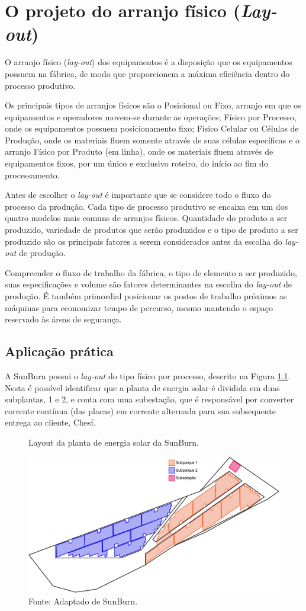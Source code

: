 \chapter{O projeto do arranjo físico (\textit{Lay-out})}
\label{chap:projeto_do_arranjo}
O arranjo físico (\textit{lay-out}) dos equipamentos é a disposição que os equipamentos possuem na fábrica, de modo que proporcionem a máxima eficiência dentro do processo produtivo.

Os principais tipos de arranjos físicos são o Posicional ou Fixo, arranjo em que os equipamentos e operadores movem-se durante as operações; Físico por Processo, onde os equipamentos possuem posicionamento fixo; Físico Celular ou Células de Produção, onde os materiais fluem somente através de suas células específicas e o arranjo Físico por Produto (em linha), onde os materiais fluem através de equipamentos fixos, por um único e exclusivo roteiro, do início ao fim do processamento.

Antes de escolher o \textit{lay-out} é importante que se considere todo o fluxo do processo da produção. Cada tipo de processo produtivo se encaixa em um dos quatro modelos mais comuns de arranjos físicos. Quantidade do produto a ser produzido, variedade de produtos que serão produzidos e o tipo de produto a ser produzido são os principais fatores a serem considerados antes da escolha do \textit{lay-out} de produção.

Compreender o fluxo de trabalho da fábrica, o tipo de elemento a ser produzido, suas especificações e volume são fatores determinantes na escolha do \textit{lay-out} de produção. É também primordial posicionar os postos de trabalho próximos as máquinas para economizar tempo de percurso, mesmo mantendo o espaço reservado às áreas de segurança.

\section{Aplicação prática}
\label{sec:projeto_do_arranjo_aplicacao}
A SunBurn possui o \textit{lay-out} do tipo físico por processo, descrito na Figura \ref{fig:arranjo_fisico_aplicacao}. Nesta é possível identificar que a planta de energia solar é dividida em duas subplantas, 1 e 2, e conta com uma subestação, que é responsável por converter corrente contínua (das placas) em corrente alternada para sua subsequente entrega ao cliente, Chesf.


\begin{figure}[H]
    \caption{Layout da planta de energia solar da SunBurn.}
    \includegraphics[width=1\textwidth]{images/layout.jpg}
    \caption*{Fonte: Adaptado de SunBurn.}
    \label{fig:arranjo_fisico_aplicacao}
  \end{figure}
